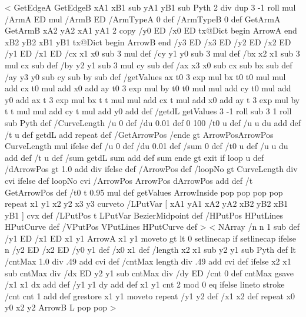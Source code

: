%
<{%
	GetEdgeA GetEdgeB
	xA1 xB1 sub yA1 yB1 sub
	Pyth 2 div dup 3 -1 roll mul
	/ArmA ED
	mul
	/ArmB ED
	/ArmTypeA 0 def
	/ArmTypeB 0 def
	GetArmA GetArmB
	xA2 yA2 xA1 yA1
	2 copy
	/y0 ED /x0 ED
	tx@Dict begin
		ArrowA
	end
	xB2 yB2 xB1 yB1
	tx@Dict begin
		ArrowB
	end
	/y3 ED /x3 ED /y2 ED /x2 ED /y1 ED /x1 ED
	/cx x1 x0 sub 3 mul def
	/cy y1 y0 sub 3 mul def
	/bx x2 x1 sub 3 mul cx sub def
	/by y2 y1 sub 3 mul cy sub def
	/ax x3 x0 sub cx sub bx sub def
	/ay y3 y0 sub cy sub by sub def
	/getValues {
		ax t0 3 exp mul bx t0 t0 mul mul add cx t0 mul add x0 add
		ay t0 3 exp mul by t0 t0 mul mul add cy t0 mul add y0 add
		ax t 3 exp mul bx t t mul mul add cx t mul add x0 add
	ay t 3 exp mul by t t mul mul add cy t mul add y0 add
	} def
	/getdL {
		getValues
		3 -1 roll sub 3 1 roll sub Pyth
	} def
	/CurveLength {
		/u 0 def
		/du 0.01 def
		0 100 {
			/t0 u def
			/u u du add def
			/t u def
			getdL add
		} repeat } def
	/GetArrowPos {
		/ende \psk@ArrowInsidePos{} gt {ArrowPos}{ArrowPos CurveLength mul} ifelse def
		/u 0 def
		/du 0.01 def
		/sum 0 def
		{
			/t0 u def
			/u u du add def
			/t u def
			/sum getdL sum add def
			sum ende gt {exit} if
		} loop u
	} def
	/dArrowPos  gt {%
		1.0  add div
	}{ \psk@ArrowInsidePos } ifelse def
	/ArrowPos \psk@ArrowInsideOffset\space def
	/loopNo \psk@ArrowInsidePos{} gt {%
		CurveLength \psk@ArrowInsidePos\space div cvi
		}{ \psk@ArrowInsideNo } ifelse def
	loopNo cvi {
		/ArrowPos ArrowPos dArrowPos add def
		/t GetArrowPos def
		/t0 t 0.95 mul def
		getValues
		ArrowInside pop pop pop pop
	} repeat
	x1 y1 x2 y2 x3 y3 curveto
	/LPutVar [ xA1 yA1 xA2 yA2 xB2 yB2 xB1 yB1 ] cvx def
	/LPutPos { t LPutVar BezierMidpoint } def
	/HPutPos { { HPutLines } HPutCurve } def
	/VPutPos { { VPutLines } HPutCurve } def
}>
%
%
%
<{%
  NArray
  /n n 1 sub def
  /y1 ED /x1 ED x1 y1 ArrowA x1 y1 moveto
  \psk@linecap{} gt
    {\psk@linecap{} lt {0 setlinecap} if }
    {\psk@linecap\space setlinecap} ifelse
  n {
    /y2 ED /x2 ED
    /y0 y1 def /x0 x1 def
    /length x2 x1 sub y2 y1 sub Pyth def
    \psk@dashNo{} lt
      {/cntMax 1.0 \psk@dashNo\space div .49 add cvi def}
      {/cntMax length \psk@dashNo\space div .49 add cvi def} ifelse
    x2 x1 sub cntMax div /dx ED
    y2 y1 sub cntMax div /dy ED
    /cnt 0 def
    cntMax {
      gsave
      /x1 x1 dx add def
      /y1 y1 dy add def
      x1 y1
      cnt 2 mod 0 eq
        { \pst@usecolor\psDashColorI }
	{ \pst@usecolor\psDashColorII } ifelse
      lineto stroke
      /cnt cnt 1 add def
      grestore
      x1 y1 moveto
    } repeat
    /y1 y2 def /x1 x2 def
  } repeat
  x0 y0 x2 y2 ArrowB L pop pop
}>
